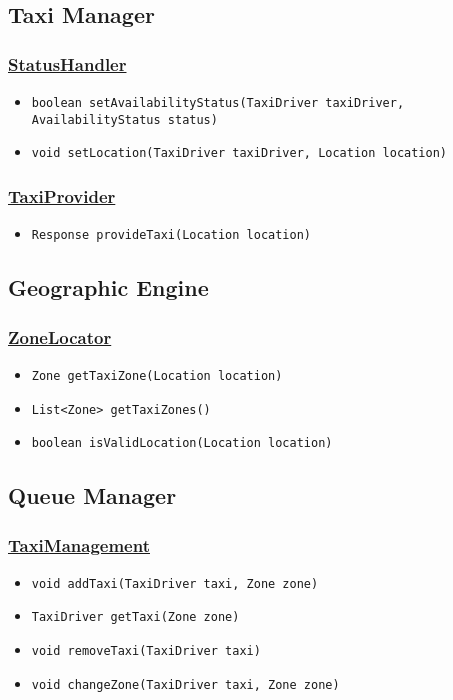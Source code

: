 \subsection{Taxi Manager}
\subsubsection{\underline{StatusHandler}}
\begin{itemize}
	\item \texttt{boolean setAvailabilityStatus(TaxiDriver taxiDriver, AvailabilityStatus status)}
	\item \texttt{void setLocation(TaxiDriver taxiDriver, Location location)}
\end{itemize}
\subsubsection{\underline{TaxiProvider}}
\begin{itemize}
	\item \texttt{Response provideTaxi(Location location)}
\end{itemize}
\subsection{Geographic Engine}
\subsubsection{\underline{ZoneLocator}}
\begin{itemize}
	\item \texttt{Zone getTaxiZone(Location location)}
	\item \texttt{List<Zone> getTaxiZones()}
	\item \texttt{boolean isValidLocation(Location location)}
\end{itemize}
\subsection{Queue Manager}
\subsubsection{\underline{TaxiManagement}}
\begin{itemize}
	\item \texttt{void addTaxi(TaxiDriver taxi, Zone zone)}
	\item \texttt{TaxiDriver getTaxi(Zone zone)}
	\item \texttt{void removeTaxi(TaxiDriver taxi)}
	\item \texttt{void changeZone(TaxiDriver taxi, Zone zone)}
\end{itemize}